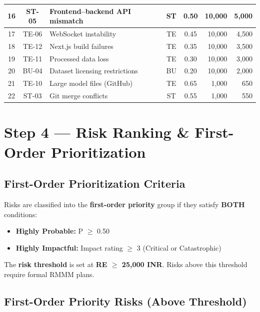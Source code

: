 \documentclass[11pt, a4paper]{article}
\begin{document}
\begin{longtable}{|c|c|p{4.5cm}|c|c|r|r|}
\hline
16 & ST-05 & Frontend--backend API mismatch & ST & 0.50 & 10,000 & 5,000 \\
\hline
17 & TE-06 & WebSocket instability & TE & 0.45 & 10,000 & 4,500 \\
\hline
18 & TE-12 & Next.js build failures & TE & 0.35 & 10,000 & 3,500 \\
\hline
19 & TE-11 & Processed data loss & TE & 0.30 & 10,000 & 3,000 \\
\hline
20 & BU-04 & Dataset licensing restrictions & BU & 0.20 & 10,000 & 2,000 \\
\hline
21 & TE-10 & Large model files (GitHub) & TE & 0.65 & 1,000 & 650 \\
\hline
22 & ST-03 & Git merge conflicts & ST & 0.55 & 1,000 & 550 \\
\hline
\end{longtable}
\normalsize

\newpage

\section{Step 4 --- Risk Ranking \& First-Order Prioritization}
\label{sec:ranking}

\subsection{First-Order Prioritization Criteria}

\begin{infobox}
Risks are classified into the \textbf{first-order priority} group if they satisfy \textbf{BOTH} conditions:
\begin{itemize}[leftmargin=*]
    \item \textbf{Highly Probable:} P $\geq$ 0.50
    \item \textbf{Highly Impactful:} Impact rating $\geq$ 3 (Critical or Catastrophic)
\end{itemize}
The \textbf{risk threshold} is set at \textbf{RE $\geq$ 25,000 INR}. Risks above this threshold require formal RMMM plans.
\end{infobox}

\subsection{First-Order Priority Risks (Above Threshold)}
\end{document}

